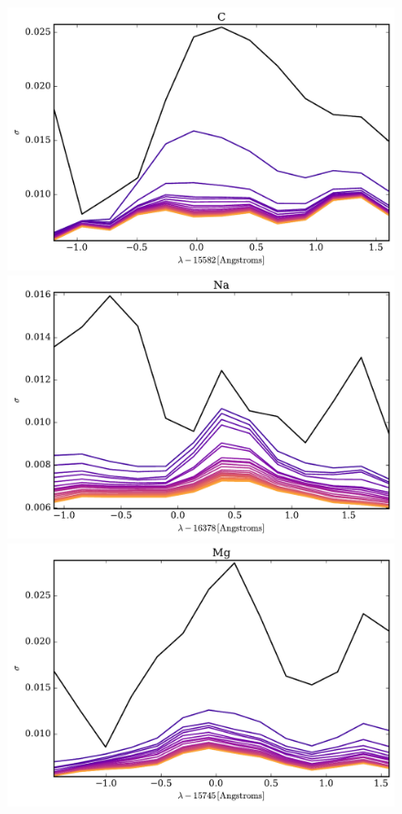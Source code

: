 \documentclass[a4paper,fleqn,usenatbib]{mnras}
\begin{document}
\begin{figure}
	\includegraphics[width=\columnwidth]{apogee_centers_final_29502_spc_win_wid_1p5_c_conditional_stddevs.pdf}
	\includegraphics[width=\columnwidth]{apogee_centers_final_29502_spc_win_wid_1p5_na_conditional_stddevs.pdf}
	\includegraphics[width=\columnwidth]{apogee_centers_final_29502_spc_win_wid_1p5_mg_conditional_stddevs.pdf}

\end{figure}
\end{document}
